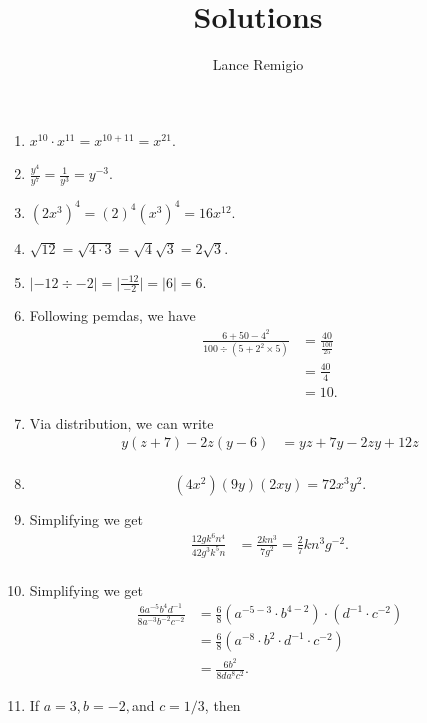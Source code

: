 \documentclass{article}
\title{Solutions}
\author{Lance Remigio}
\begin{document}
\maketitle   

\begin{enumerate}
    \item \( x^{10} \cdot x^{11} = x^{10+11} = x^{21}\).
    \item \( \frac{y^4}{y^7} = \frac{1}{y^3} = y^{-3}.\)
    \item \( (2x^3)^4 = (2)^4 (x^3)^4 = 16x^{12}\).
    \item \( \sqrt{12} = \sqrt{ 4 \cdot 3 } = \sqrt{4} \sqrt{3} = 2 \sqrt{3}.\)
    \item \( |-12 \div -2| = \Big| \frac{-12}{-2} \Big| = | 6 | = 6.\)
    \item Following pemdas, we have 
        \begin{align*}
            \frac{6 + 50 - 4^2 }{100 \div (5 + 2^2 \times 5 )}&= \frac{40}{ \frac{100}{25}} \\
                                                              &= \frac{40}{4} \\
                                                              &= 10.
        \end{align*}
    \item Via distribution, we can write 
    \begin{align*}
        y(z+7) - 2z(y-6) &= yz+7y - 2zy + 12z \\
    \end{align*}
\item \[ (4x^2)(9y)(2xy) = 72x^3y^2.\]
\item Simplifying we get
    \begin{align*}
        \frac{12gk^6 n^4}{42 g^3 k^5 n }&= \frac{2kn^3}{7g^2} = \frac{2}{7}kn^3g^{-2}. \\
    \end{align*}
\item Simplifying we get 
\begin{align*}
    \frac{6a^{-5}b^4 d^{-1}}{8a^{-3}b^{-2}c^{-2}} &= \frac{6}{8} (a^{-5 - 3} \cdot b^{4 - 2 }) \cdot (d^{-1} \cdot c^{-2}) \\
                                                  &= \frac{6}{8} (a^{-8} \cdot b^2 \cdot d^{-1} \cdot c^{-2}) \\ 
                                                  &= \frac{6b^2}{8da^8c^2 }.
\end{align*}
\item If \( a = 3, b = -2, \)and \( c = 1/3\), then 

\end{enumerate}
\end{document}
